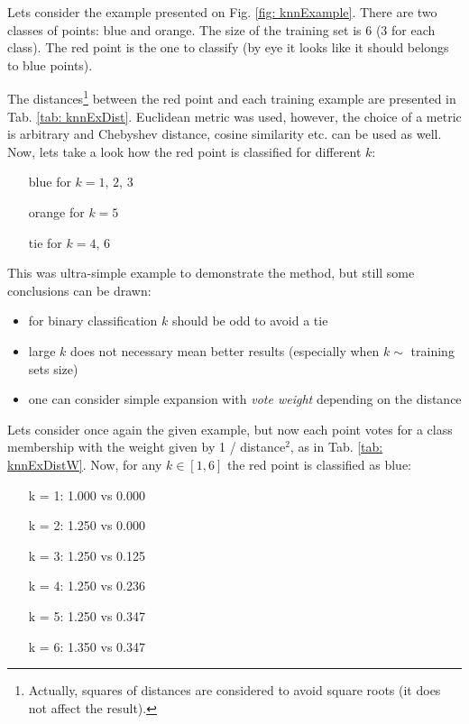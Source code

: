 Lets consider the example presented on Fig. \ref{fig: knnExample}. There are two classes of points: blue and orange. The size of the training set is 6 (3 for each class). The red point is the one to classify (by eye it looks like it should belongs to blue points).

The distances\footnote{Actually, squares of distances are considered to avoid square roots (it does not affect the result).} between the red point and each training example are presented in Tab. \ref{tab: knnExDist}. Euclidean metric was used, however, the choice of a metric is arbitrary and Chebyshev distance, cosine similarity etc. can be used as well. Now, lets take a look how the red point is classified for different $k$:

\begin{itemize}[leftmargin = 100pt]
 \item[\color{mblue}blue] for $k = 1$, $2$, $3$
 \item[\color{morange}orange] for $k = 5$
 \item[\color{mred}tie] for $k = 4$, $6$
\end{itemize}

This was ultra-simple example to demonstrate the method, but still some conclusions can be drawn:

\begin{itemize}
  \item for binary classification $k$ should be odd to avoid a tie
  \item large $k$ does not necessary mean better results (especially when $k \sim$ training sets size)
  \item one can consider simple expansion with {\it vote weight} depending on the distance
\end{itemize}

Lets consider once again the given example, but now each point votes for a class membership with the weight given by 1 / distance$^2$, as in Tab. \ref{tab: knnExDistW}. Now, for any $k \in [1,6]$ the red point is classified as blue:

\begin{itemize}[leftmargin = 100pt]
 \item[k = 1:] {\color{mblue}1.000} vs {\color{morange}0.000} 
 \item[k = 2:] {\color{mblue}1.250} vs {\color{morange}0.000} 
 \item[k = 3:] {\color{mblue}1.250} vs {\color{morange}0.125} 
 \item[k = 4:] {\color{mblue}1.250} vs {\color{morange}0.236} 
 \item[k = 5:] {\color{mblue}1.250} vs {\color{morange}0.347} 
 \item[k = 6:] {\color{mblue}1.350} vs {\color{morange}0.347} 
\end{itemize}

